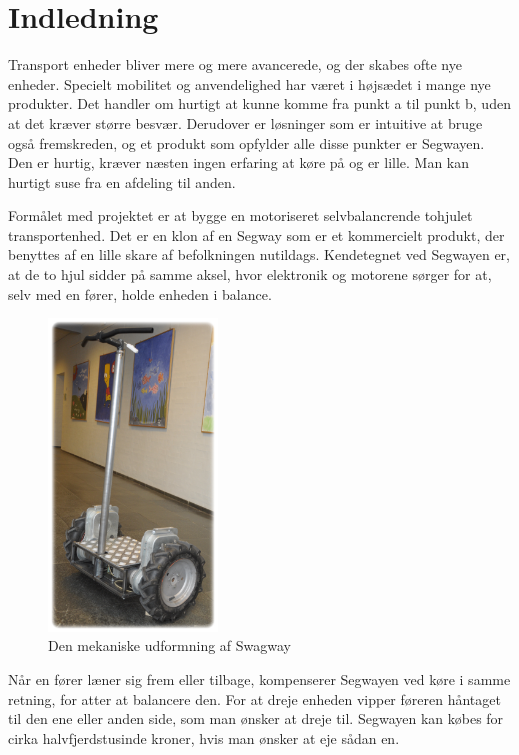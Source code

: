 \documentclass[a4paper,11pt,oneside,article,danish,table]{memoir}
\begin{document}
\chapter{Indledning}\label{chap:ind}
Transport enheder bliver mere og mere avancerede, og der skabes ofte nye enheder. Specielt mobilitet og anvendelighed har været i højsædet i mange nye produkter. Det handler om hurtigt at kunne komme fra punkt a til punkt b, uden at det kræver større besvær. Derudover er løsninger som er intuitive at bruge også fremskreden, og et produkt som opfylder alle disse punkter er Segwayen. Den er hurtig, kræver næsten ingen erfaring at køre på og er lille. Man kan hurtigt suse fra en afdeling til anden. 

Formålet med projektet er at bygge en motoriseret selvbalancrende tohjulet transportenhed. Det er en klon af en Segway som er et kommercielt produkt, der benyttes af en lille skare af befolkningen nutildags. Kendetegnet ved Segwayen er, at de to hjul sidder på samme aksel, hvor elektronik og motorene sørger for at, selv med en fører, holde enheden i balance.
\begin{figure}[htbp]
  \centering
  \includegraphics[width=0.4\textwidth]{pictures/swagway.jpg}
  \caption{Den mekaniske udformning af Swagway}
\end{figure}
Når en fører læner sig frem eller tilbage, kompenserer Segwayen ved køre i samme retning, for atter at balancere den. For at dreje enheden vipper føreren håntaget til den ene eller anden side, som man ønsker at dreje til. Segwayen kan købes for cirka halvfjerdstusinde kroner, hvis man ønsker at eje sådan en.
\end{document}
